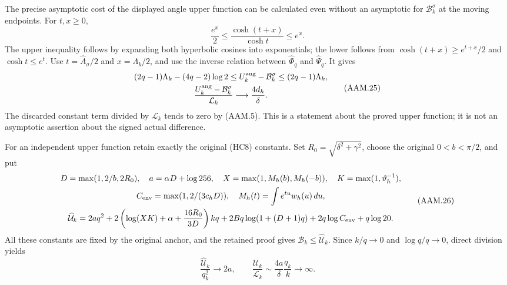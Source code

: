 The precise asymptotic cost of the displayed angle upper function
can be calculated even without an asymptotic for
$\mathcal B_k^\sigma$ at the moving endpoints. For $t,x\geq0$,
\[
 \frac{e^x}{2}\leq\frac{\cosh(t+x)}{\cosh t}\leq e^x.
\]
The upper inequality follows by expanding both hyperbolic cosines into
exponentials; the lower follows from $\cosh(t+x)\geq e^{t+x}/2$
and $\cosh t\leq e^t$. Use $t=\widehat A_\sigma/2$ and
$x=\Lambda_k/2$, and use the inverse relation between
$\widehat\Phi_q$ and $\widehat\Psi_q$. It gives
\[
 \begin{gathered}
 (2q-1)\Lambda_k-(4q-2)\log2
 \leq U_k^{\rm ang}-\mathcal B_k^\sigma
 \leq(2q-1)\Lambda_k,\\
 \frac{U_k^{\rm ang}-\mathcal B_k^\sigma}{\mathcal L_k}
       \longrightarrow\frac{4d_h}{\delta}.
 \end{gathered}
 \tag{AAM.25}
\]
The discarded constant term divided by $\mathcal L_k$ tends to zero
by (AAM.5). This is a statement about the proved upper function;
it is not an asymptotic assertion about the signed actual difference.

For an independent upper function retain exactly the original (HC8)
constants. Set $R_0=\sqrt{\delta^2+\gamma^2}$, choose the original
$0<b<\pi/2$, and put
\[
 \begin{gathered}
 D=\max(1,2/b,2R_0),\quad a=\alpha D+\log256,\quad
 X=\max(1,M_h(b),M_h(-b)),\quad
 K=\max(1,\vartheta_h^{-1}),\\
 C_{\rm env}=\max(1,2/(3c_hD)),\quad
 M_h(t)=\int e^{tu}w_h(u)\,du,\\
 \widehat{\mathcal U}_k=2a q^2+
 2\left(\log(XK)+\alpha+\frac{16R_0}{3D}\right)kq
 +2Bq\log(1+(D+1)q)+2q\log C_{\rm env}+q\log20.
 \end{gathered}
 \tag{AAM.26}
\]
All these constants are fixed by the original anchor, and the retained
proof gives $\mathcal B_k\leq\widehat{\mathcal U}_k$.
Since $k/q\to0$ and $\log q/q\to0$, direct division yields
\[
 \frac{\widehat{\mathcal U}_k}{q_k^2}\longrightarrow2a,
 \qquad
 \frac{\widehat{\mathcal U}_k}{\mathcal L_k}
          \sim\frac{4a}{\delta}\frac{q_k}{k}\longrightarrow\infty.
 \tag{AAM.27}
\]

